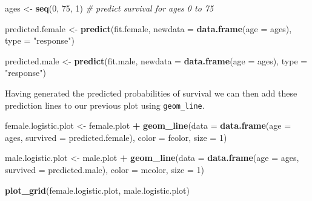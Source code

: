 \documentclass[]{book}
\newenvironment{Shaded}{\begin{snugshade}}{\end{snugshade}}
\newcommand{\CommentTok}[1]{\textcolor[rgb]{0.56,0.35,0.01}{\textit{#1}}}
\newcommand{\DataTypeTok}[1]{\textcolor[rgb]{0.13,0.29,0.53}{#1}}
\newcommand{\DecValTok}[1]{\textcolor[rgb]{0.00,0.00,0.81}{#1}}
\newcommand{\KeywordTok}[1]{\textcolor[rgb]{0.13,0.29,0.53}{\textbf{#1}}}
\newcommand{\NormalTok}[1]{#1}
\newcommand{\OperatorTok}[1]{\textcolor[rgb]{0.81,0.36,0.00}{\textbf{#1}}}
\newcommand{\StringTok}[1]{\textcolor[rgb]{0.31,0.60,0.02}{#1}}
\theoremstyle{definition}
\theoremstyle{definition}
\theoremstyle{definition}
\theoremstyle{remark}
\begin{document}
\begin{Shaded}
\begin{Highlighting}[]
\NormalTok{ages <-}\StringTok{ }\KeywordTok{seq}\NormalTok{(}\DecValTok{0}\NormalTok{, }\DecValTok{75}\NormalTok{, }\DecValTok{1}\NormalTok{) }\CommentTok{# predict survival for ages 0 to 75}

\NormalTok{predicted.female <-}\StringTok{ }\KeywordTok{predict}\NormalTok{(fit.female, }
                            \DataTypeTok{newdata =} \KeywordTok{data.frame}\NormalTok{(}\DataTypeTok{age =}\NormalTok{ ages),}
                            \DataTypeTok{type =} \StringTok{"response"}\NormalTok{)}

\NormalTok{predicted.male <-}\StringTok{ }\KeywordTok{predict}\NormalTok{(fit.male,}
                          \DataTypeTok{newdata =} \KeywordTok{data.frame}\NormalTok{(}\DataTypeTok{age =}\NormalTok{ ages),}
                          \DataTypeTok{type =} \StringTok{"response"}\NormalTok{)}
                            
\end{Highlighting}
\end{Shaded}

Having generated the predicted probabilities of survival we can then add
these prediction lines to our previous plot using \texttt{geom\_line}.

\begin{Shaded}
\begin{Highlighting}[]
\NormalTok{female.logistic.plot <-}\StringTok{ }\NormalTok{female.plot }\OperatorTok{+}\StringTok{ }
\StringTok{  }\KeywordTok{geom_line}\NormalTok{(}\DataTypeTok{data =} \KeywordTok{data.frame}\NormalTok{(}\DataTypeTok{age =}\NormalTok{ ages, }\DataTypeTok{survived =}\NormalTok{ predicted.female),}
            \DataTypeTok{color =}\NormalTok{ fcolor, }\DataTypeTok{size =} \DecValTok{1}\NormalTok{)}

\NormalTok{male.logistic.plot <-}\StringTok{ }\NormalTok{male.plot }\OperatorTok{+}\StringTok{ }
\StringTok{  }\KeywordTok{geom_line}\NormalTok{(}\DataTypeTok{data =} \KeywordTok{data.frame}\NormalTok{(}\DataTypeTok{age =}\NormalTok{ ages, }\DataTypeTok{survived =}\NormalTok{ predicted.male),}
            \DataTypeTok{color =}\NormalTok{ mcolor, }\DataTypeTok{size =} \DecValTok{1}\NormalTok{)}

\KeywordTok{plot_grid}\NormalTok{(female.logistic.plot, male.logistic.plot)}
\end{Highlighting}
\end{Shaded}
\end{document}
